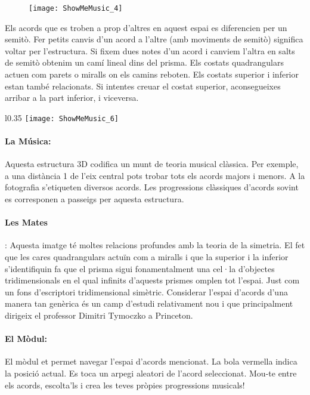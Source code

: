 \begin{figure}[h]
\centering
\texttt{[image: ShowMeMusic\_4]}
\end{figure}

Els acords que es troben a prop d'altres en aquest espai es diferencien per un semitò. Fer petits canvis d'un acord a l'altre (amb moviments de semitò) significa voltar per l'estructura. Si fixem dues notes d'un acord i canviem l'altra en salts de semitò obtenim un camí lineal dins del prisma. Els costats quadrangulars actuen com parets o miralls on els camins reboten. Els costats superior i inferior estan també relacionats. Si intentes creuar el costat superior, aconsegueixes arribar a la part inferior, i viceversa.

\begin{wrapfigure}[18]{l}{0.35\textwidth}
\centering
\texttt{[image: ShowMeMusic\_6]}
\end{wrapfigure}
\paragraph{La Música:}  Aquesta estructura 3D codifica un munt de teoria musical clàssica. Per exemple, a una distància 1 de l'eix central pots trobar tots els acords majors i menors. A la fotografia s'etiqueten diversos acords. Les progressions clàssiques d'acords sovint es corresponen a passeigs per aquesta estructura.

\paragraph{Les Mates}: Aquesta imatge té moltes relacions profundes amb la teoria de la simetria. El fet que les cares quadrangulars actuïn com a miralls i que la superior i la inferior s'identifiquin fa que el prisma sigui fonamentalment una cel·la d'objectes tridimensionals en el qual infinits d'aquests prismes omplen tot l'espai. Just com un fons d'escriptori tridimensional simètric.  Considerar l'espai d'acords d'una manera tan genèrica és un  camp d'estudi relativament nou i que principalment dirigeix el professor Dimitri Tymoczko a Princeton.\\


\paragraph{El Mòdul:} El mòdul et permet navegar l'espai d'acords mencionat. La bola vermella indica la posició actual. Es toca un arpegi aleatori de l'acord seleccionat. Mou-te entre els acords, escolta'ls i crea les teves pròpies progressions musicals!

